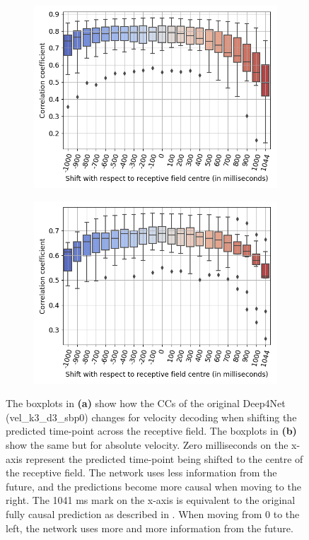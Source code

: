 \begin{figure}[!htbp]
\centering
\begin{subfigure}[a]{\textwidth}
    \centering
   \includegraphics[width=0.7\linewidth]{img/ch4/vel-shifting-performance-comparison}
   \caption{}
   \label{fig:vel-shifting-performance}
\end{subfigure}

\begin{subfigure}[b]{\textwidth}
    \centering
   \includegraphics[width=0.7\linewidth]{img/ch4/absVel-shifting-performance-comparison}
   \caption{}
   \label{fig:absVel-shiftig-performance}
\end{subfigure}
\caption[Gradual shifting - performance]{The boxplots in \textbf{(a)} show how the CCs of the original Deep4Net (vel\_k3\_d3\_sbp0) changes for velocity decoding when shifting the predicted time-point across the receptive field.
The boxplots in \textbf{(b)} show the same but for absolute velocity. Zero milliseconds on the x-axis represent the predicted time-point being shifted to the centre of the receptive field.
The network uses less information from the future, and the predictions become more causal when moving to the right.
The 1041 ms mark on the x-axis is equivalent to the original fully causal prediction as described in \cite{Hammer-2021}.
When moving from 0 to the left, the network uses more and more information from the future.}
\label{fig:shifting-performance}
\end{figure}


